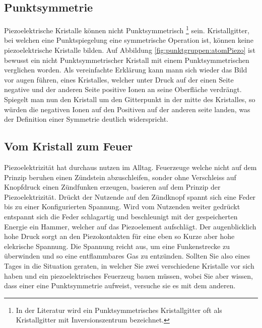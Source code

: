\subsection{Punktsymmetrie}
Piezoelektrische Kristalle können nicht Punktsymmetrisch
\footnote{In der Literatur wird ein Punktsymmetrisches Kristallgitter oft als Kristallgitter mit Inversionszentrum bezeichnet.} sein.
Kristallgitter, bei welchen eine Punktspiegelung eine symmetrische Operation ist, können keine piezoelektrische Kristalle bilden.
Auf Abbildung \ref{fig:punktgruppen:atomPiezo} ist bewusst  ein nicht Punktsymmetrischer Kristall 
mit einem Punktsymmetrischen verglichen worden.
Als vereinfachte Erklärung kann mann sich wieder das Bild vor augen führen, eines Kristalles, 
welcher unter Druck auf der einen Seite negative und der anderen Seite positive Ionen an seine Oberfläche verdrängt.
Spiegelt man nun den Kristall um den Gitterpunkt in der mitte des Kristalles, so würden die negativen Ionen auf den Positiven auf der anderen seite landen,
was der Definition einer Symmetrie deutlich widerspricht.

\subsection{Vom Kristall zum Feuer}
Piezoelektrizität hat durchaus nutzen im Alltag.
Feuerzeuge welche nicht auf dem Prinzip beruhen einen Zündstein abzuschleifen, 
sonder ohne Verschleiss auf Knopfdruck einen Zündfunken erzeugen, basieren auf dem Prinzip der Piezoelektrizität.
Drückt der Nutzende auf den Zündknopf spannt sich eine Feder bis zu einer Konfigurierten Spannung.
Wird vom Nutzenden weiter gedrückt entspannt sich die Feder schlagartig und beschleunigt mit der gespeicherten Energie ein Hammer,
welcher auf das Piezoelement aufschlägt.
Der augenblicklich hohe Druck sorgt an den Piezokontakten für eine eben so Kurze aber hohe elekrische Spannung.
Die Spannung reicht aus, um eine Funkenstrecke zu überwinden und so eine entflammbares Gas zu entzünden.
Sollten Sie also eines Tages in die Situation geraten, in welcher Sie zwei verschiedene Kristalle vor sich haben
und ein piezoelektrisches Feuerzeug bauen müssen,
wobei Sie aber wissen, dass einer eine Punktsymmetrie aufweist,
versuche sie es mit dem anderen.

